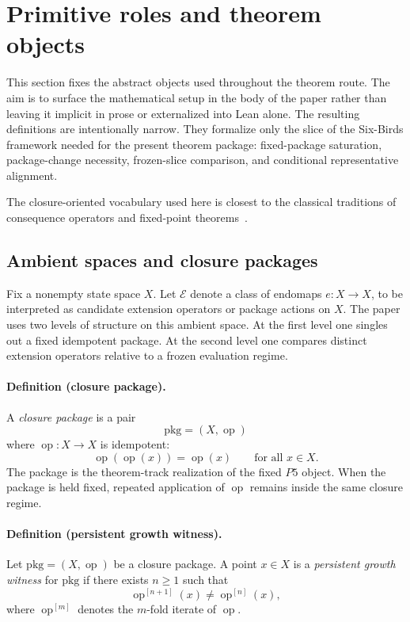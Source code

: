 \section{Primitive roles and theorem objects}\label{sec:primitive-roles}

This section fixes the abstract objects used throughout the theorem route. The aim is to surface the mathematical setup in the body of the paper rather than leaving it implicit in prose or externalized into Lean alone. The resulting definitions are intentionally narrow. They formalize only the slice of the Six-Birds framework needed for the present theorem package: fixed-package saturation, package-change necessity, frozen-slice comparison, and conditional representative alignment.

The closure-oriented vocabulary used here is closest to the classical traditions of consequence operators and fixed-point theorems~\cite{TarskiConsequence1930,TarskiFixedPoint1955}.

\subsection*{Ambient spaces and closure packages}

Fix a nonempty state space $X$. Let $\mathcal{E}$ denote a class of endomaps $e \colon X \to X$, to be interpreted as candidate extension operators or package actions on $X$. The paper uses two levels of structure on this ambient space. At the first level one singles out a fixed idempotent package. At the second level one compares distinct extension operators relative to a frozen evaluation regime.

\paragraph{Definition (closure package).}
A \emph{closure package} is a pair
\[
\mathrm{pkg}=(X,\operatorname{op})
\]
where $\operatorname{op}\colon X\to X$ is idempotent:
\[
\operatorname{op}(\operatorname{op}(x))=\operatorname{op}(x)\qquad \text{for all }x\in X.
\]
The package is the theorem-track realization of the fixed \(P5\) object. When the package is held fixed, repeated application of $\operatorname{op}$ remains inside the same closure regime.

\paragraph{Definition (persistent growth witness).}
Let $\mathrm{pkg}=(X,\operatorname{op})$ be a closure package. A point $x\in X$ is a \emph{persistent growth witness} for $\mathrm{pkg}$ if there exists $n\ge 1$ such that
\[
\operatorname{op}^{[n+1]}(x)\neq \operatorname{op}^{[n]}(x),
\]
where $\operatorname{op}^{[m]}$ denotes the $m$-fold iterate of $\operatorname{op}$.

